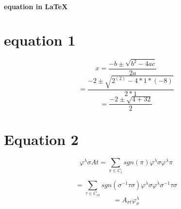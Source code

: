 \documentclass[10pt,a4paper]{article}
\begin{document}
\begin{center}
    \Large{\textbf{equation in \LaTeX}}
\end{center}
\section*{equation 1}
\begin{fleqn}
\[
x=\frac{-b\pm \sqrt{b^{2}-4ac}}{2a}
\]
\[
=\frac{-2\pm \sqrt{2^(2)-4*1*(-8)}}{2*1}
\]
\[
=\frac{-2\pm \sqrt{4+32}}{2}
\]
\end{fleqn}
\section*{Equation 2}
\begin{fleqn}
    \[
    \varphi^{\lambda}{\sigma}A{t}=\sum_{\pi \in C_{t}}sgn(\pi)\varphi^{\lambda}{\sigma}\varphi^{\lambda}{\pi}
    \]

    \[
    =\sum_{\tau \in C_{\sigma t}} sgn(\sigma^{-1}\tau\sigma)\varphi^{\lambda}{\sigma}\varphi^{\lambda}{\sigma^{-1}\tau\sigma}
    \]
    \[
    =A_{\sigma t}\varphi^{\lambda}_{\sigma}
    \]
\end{fleqn}
\end{document}
